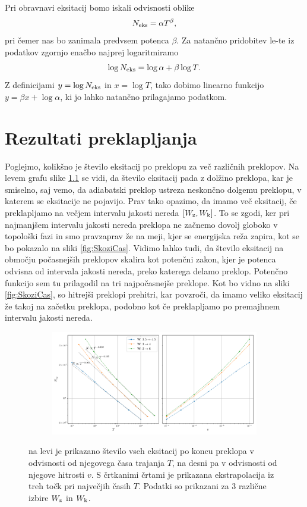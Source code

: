 Pri obravnavi eksitacij bomo iskali odvisnosti oblike 
\begin{equation}
N_{\textup{eks}} = \alpha T^{\beta},
\end{equation}
pri čemer nas bo zanimala predvsem potenca $\beta$. Za natančno pridobitev le-te iz podatkov zgornjo enačbo najprej logaritmiramo
\begin{equation}
\log N_{\textup{eks}} = \log \alpha + \beta \log T.
\end{equation}
Z definicijami $y=\log N_{\textup{eks}}$ in $x=\log T$, tako dobimo linearno funkcijo $y=\beta x + \log \alpha$, ki jo lahko natančno prilagajamo podatkom.

\chapter{Rezultati preklapljanja}
Poglejmo, kolikšno je število eksitacij po preklopu za več različnih preklopov. Na levem grafu slike \ref{fig:Skaliranje} se vidi, da število eksitacij pada z dolžino preklopa, kar je smiselno, saj vemo, da adiabatski preklop ustreza neskončno dolgemu preklopu, v katerem se eksitacije ne pojavijo.
Prav tako opazimo, da imamo več eksitacij, če preklapljamo na večjem intervalu jakosti nereda $[W_{\textup{z}}, W_{\textup{k}}]$. To se zgodi, ker pri najmanjšem intervalu jakosti nereda preklopa ne začnemo dovolj globoko v topološki fazi in smo pravzaprav že na meji, kjer se energijska reža zapira, kot se bo pokazalo na sliki \ref{fig:SkoziCas}. Vidimo lahko tudi, da število eksitacij na območju počasnejših preklopov skalira kot potenčni zakon, kjer je potenca odvisna od intervala jakosti nereda, preko katerega delamo preklop. Potenčno funkcijo sem tu prilagodil na tri najpočasnejše preklope. Kot bo vidno na sliki \ref{fig:SkoziCas}, so hitrejši preklopi prehitri, kar povzroči, da imamo veliko eksitacij že takoj na začetku preklopa, podobno kot če preklapljamo po premajhnem intervalu jakosti nereda.
\begin{figure}[H]
\centering
\begin{subfigure}{.99\textwidth}
\includegraphics[width=\linewidth]{Figures/Skaliranje3Alt.pdf}
\end{subfigure}
\caption{na levi je prikazano število vseh eksitacij po koncu preklopa v odvisnosti od njegovega časa trajanja $T$, na desni pa v odvisnosti od njegove hitrosti $v$. S črtkanimi črtami je prikazana ekstrapolacija iz treh točk pri največjih časih $T$. Podatki so prikazani za 3 različne izbire $W_{\textup{z}}$ in $W_{\textup{k}}$.}
\label{fig:Skaliranje}
\end{figure}
